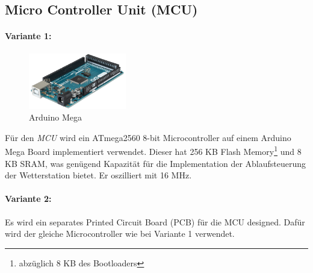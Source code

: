 \subsection{Micro Controller Unit (MCU)}
\paragraph{Variante 1:}
\begin{figure}
  \vspace{-10pt}
  \begin{center}
    \includegraphics[width=0.38\textwidth]{graphics/arduino_mega.png}
  \end{center}
  \vspace{-10pt}
  \caption{Arduino Mega}
  \vspace{-10pt}
  \label{fig:arduino_mega}
\end{figure}
Für den \textit{MCU} wird ein ATmega2560 8-bit Microcontroller auf einem Arduino Mega Board implementiert verwendet. Dieser hat 256 KB Flash Memory\footnote{abzüglich 8 KB des Bootloaders} und 8 KB SRAM, was genügend Kapazität für die Implementation der Ablaufsteuerung der Wetterstation bietet. Er oszilliert mit 16 MHz.\\

\paragraph{Variante 2:}

Es wird ein separates Printed Circuit Board (PCB) für die MCU designed. Dafür wird der gleiche Microcontroller wie bei Variante 1 verwendet.\\

